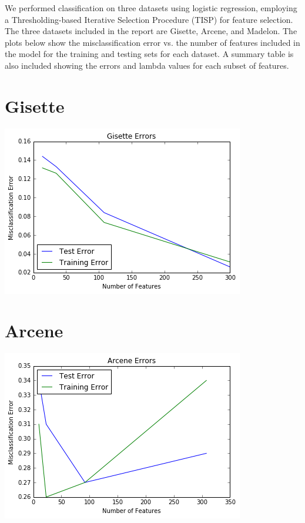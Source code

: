 \documentclass[letter]{article} %
\begin{document}
\setlength{\headsep}{0.5 in}

We performed classification on three datasets using logistic regression, employing a Thresholding-based Iterative Selection Procedure (TISP) for feature selection. The three datasets included in the report are Gisette, Arcene, and Madelon. The plots below show the misclassification error vs. the number of features included in the model for the training and testing sets for each dataset.  A summary table is also included showing the errors and lambda values for each subset of features.

\section*{Gisette}
\includegraphics[scale=0.8]{gisette}

\section*{Arcene}
\includegraphics[scale=0.8]{arcene}
\end{document}
